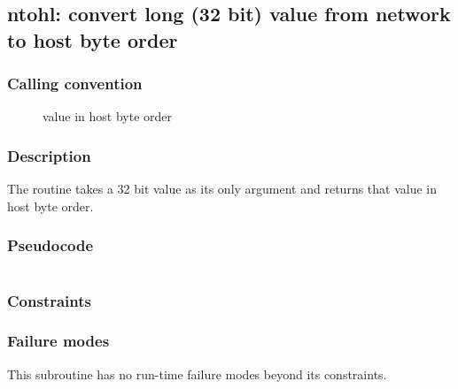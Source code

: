 \clearpage
{}
{}
\label{subr:ntohl}
\subsection*{ntohl: convert long (32 bit) value from network to host
  byte order}

\subsubsection*{Calling convention}

\begin{description}
\item[] value in host byte order
\end{description}

\subsubsection*{Description}

The  routine takes a 32 bit value as its only
argument and returns that value in host byte order.

\subsubsection*{Pseudocode}

\begin{verbatim}
\end{verbatim}

\subsubsection*{Constraints}

\subsubsection*{Failure modes}

This subroutine has no run-time failure modes beyond its constraints.
